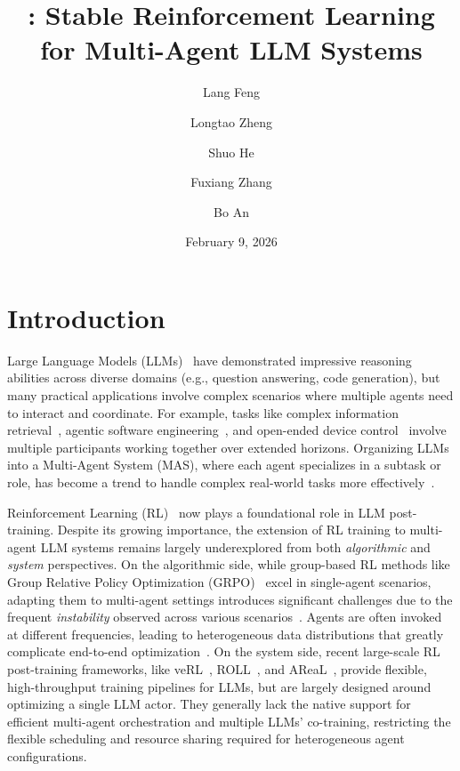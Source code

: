 \documentclass[]{fairmeta}
\title{\methodname{}: Stable Reinforcement Learning for Multi-Agent LLM Systems}
\author[1]{Lang Feng}
\author[1]{Longtao Zheng}
\author[1]{Shuo He}
\author[1]{Fuxiang Zhang}
\author[1]{Bo An}
\affiliation[1]{Nanyang Technological University, Singapore}
\date{February 9, 2026}
\theoremstyle{plain}
\theoremstyle{definition}
\theoremstyle{remark}
\begin{document}
\maketitle



\newcommand{\fix}{\marginpar{FIX}}
\newcommand{\new}{\marginpar{NEW}}

\section{Introduction}
Large Language Models (LLMs)~\citep{achiam2023gpt,team2023gemini,liu2024deepseek,yang2025qwen3} have demonstrated impressive reasoning abilities across diverse domains (e.g., question answering, code generation), but many practical applications involve complex scenarios where multiple agents need to interact and coordinate. For example, tasks like complex information retrieval~\citep{chang2025main,zhang2025agentorchestra}, agentic software engineering~\citep{hong2024metagpt,qian2024chatdev}, and open-ended device control~\citep{wang2024mobile,tan2024cradle} involve multiple participants working together over extended horizons. Organizing LLMs into a Multi-Agent System (MAS), where each agent specializes in a subtask or role, has become a trend to handle complex real-world tasks more effectively~\citep{tran2025multi,zhang2025landscape}.


Reinforcement Learning (RL)~\citep{sutton2018reinforcement} now plays a foundational role in LLM post-training. Despite its growing importance, the extension of RL training to multi-agent LLM systems remains largely underexplored from both \textit{algorithmic} and \textit{system} perspectives.
On the algorithmic side, while group-based RL methods like Group Relative Policy Optimization (GRPO)~\citep{shao2024deepseekmath} excel in single-agent scenarios, adapting them to multi-agent settings introduces significant challenges due to the frequent \textit{instability} observed across various scenarios~\citep{chen2025heterogeneous,zhao2025stronger,yuan2025marshal}. Agents are often invoked at different frequencies, leading to heterogeneous data distributions that greatly complicate end-to-end optimization~\citep{hong2025multi}.
On the system side, recent large-scale RL post-training frameworks, like veRL~\citep{sheng2024hybridflow}, ROLL~\citep{wang2025reinforcement}, and AReaL~\citep{fu2025areal}, provide flexible, high-throughput training pipelines for LLMs, but are largely designed around optimizing a single LLM actor. They generally lack the native support for efficient multi-agent orchestration and multiple LLMs' co-training, restricting the flexible scheduling and resource sharing required for heterogeneous agent configurations.
\end{document}
